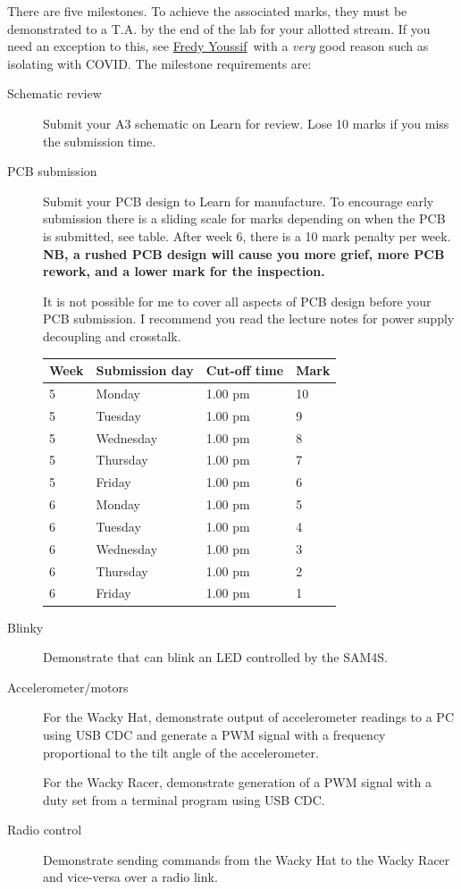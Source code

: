 \documentclass[11pt, a4paper]{article}
\makeatletter
\newcommand{\fredy}{\href{mailto:fredy.youssif@pg.canterbury.ac.nz}{Fredy Youssif}}
\makeatother
\begin{document}
There are five milestones.  To achieve the associated marks, they must
be demonstrated to a T.A. by the end of the lab for your allotted
stream.  If you need an exception to this, see \fredy\ with a
\emph{very} good reason such as isolating with COVID.  The milestone
requirements are:
%
\begin{description}
\item [Schematic review] Submit your A3 schematic on Learn for
  review.  Lose 10 marks if you miss the submission time.

\item [PCB submission] Submit your PCB design to Learn for
  manufacture.  To encourage early submission there is a sliding scale
  for marks depending on when the PCB is submitted, see table.  After
  week 6, there is a 10 mark penalty per week.  \textbf{NB, a rushed
    PCB design will cause you more grief, more PCB rework, and a lower
    mark for the inspection.}

  It is not possible for me to cover all aspects of PCB design before
  your PCB submission.  I recommend you read the lecture notes for
  power supply decoupling and crosstalk.

  \begin{tabular}{llll}
    Week & Submission day & Cut-off time  & Mark \\ \hline
    5    & Monday       & 1.00 pm & 10 \\
    5    & Tuesday      & 1.00 pm & 9 \\
    5    & Wednesday    & 1.00 pm & 8 \\
    5    & Thursday     & 1.00 pm & 7 \\
    5    & Friday       & 1.00 pm & 6 \\
    6    & Monday       & 1.00 pm & 5 \\
    6    & Tuesday      & 1.00 pm & 4 \\
    6    & Wednesday    & 1.00 pm & 3 \\
    6    & Thursday     & 1.00 pm & 2 \\
    6    & Friday       & 1.00 pm & 1  \\
  \end{tabular}

\item [Blinky] Demonstrate that can blink an LED controlled by the SAM4S.

\item [Accelerometer/motors] For the Wacky Hat, demonstrate output of
  accelerometer readings to a PC using USB CDC and generate a PWM
  signal with a frequency proportional to the tilt angle of the
  accelerometer.

  For the Wacky Racer, demonstrate generation of a PWM signal with a
  duty set from a terminal program using USB CDC.

\item[Radio control]

  Demonstrate sending commands from the Wacky Hat to the Wacky Racer
  and vice-versa over a radio link.

\end{description}
\end{document}

